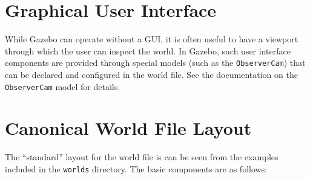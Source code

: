 \documentclass[11pt]{report}
\begin{document}
\section{Graphical User Interface}

While Gazebo can operate without a GUI, it is often useful to have a
viewport through which the user can inspect the world.  In Gazebo,
such user interface components are provided through special models
(such as the {\tt ObserverCam}) that can be declared and configured in
the world file.  See the documentation on the {\tt ObserverCam} model
for details.


\section{Canonical World File Layout}

The ``standard'' layout for the world file is can be seen from the
examples included in the {\tt worlds} directory.  The basic components
are as follows:
\end{document}

